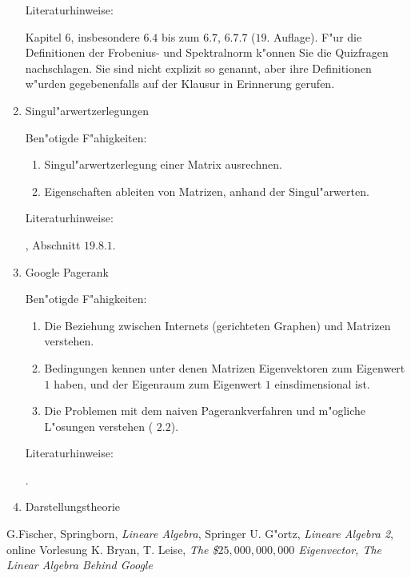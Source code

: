 \documentclass[a4paper]{article}
\begin{document}
\begin{enumerate}
Literaturhinweise:

\cite{FS} Kapitel $6$, insbesondere $6.4$ bis zum $6.7$, $6.7.7$ ($19$. Auflage). F"ur die Definitionen der Frobenius- und Spektralnorm k"onnen Sie die Quizfragen nachschlagen. Sie sind nicht explizit so genannt, aber ihre Definitionen w"urden gegebenenfalls auf der Klausur in Erinnerung gerufen.

\item
Singul"arwertzerlegungen

Ben"otigde F"ahigkeiten:
\begin{enumerate}
\item
Singul"arwertzerlegung einer Matrix ausrechnen.
\item
Eigenschaften ableiten von Matrizen, anhand der Singul"arwerten.
\end{enumerate}

Literaturhinweise:

\cite{G}, Abschnitt $19.8.1$.

\item
Google Pagerank

Ben"otigde F"ahigkeiten:
\begin{enumerate}
\item
Die Beziehung zwischen Internets (gerichteten Graphen) und Matrizen verstehen.
\item
Bedingungen kennen unter denen Matrizen Eigenvektoren zum Eigenwert $1$ haben, und der Eigenraum zum Eigenwert $1$ einsdimensional ist.
\item
Die Problemen mit dem naiven Pagerankverfahren und m"ogliche L"osungen verstehen (\cite{BL} $2.2$).
\end{enumerate}

Literaturhinweise:

\cite{BL}.

\item
Darstellungstheorie

\end{enumerate}

\begin{thebibliography}{10}
G.Fischer, Springborn, \emph{Lineare Algebra}, Springer
U. G"ortz, \emph{Lineare Algebra 2}, online Vorlesung
K. Bryan, T. Leise, \emph{The \$$25,000,000,000$ Eigenvector, The Linear Algebra Behind Google}
\end{thebibliography}
\end{document}
